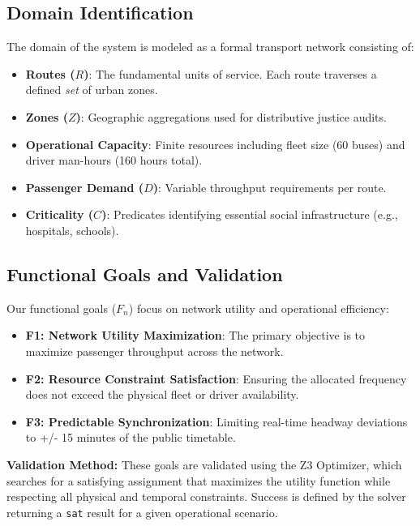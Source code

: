 \documentclass[]
{UCD_CS_41820_Report}
\begin{document}
\subsection{Domain Identification}
The domain of the system is modeled as a formal transport network consisting of:
\begin{itemize}
  \item \textbf{Routes ($R$)}: The fundamental units of service. Each route traverses a defined \textit{set} of urban zones.
  \item \textbf{Zones ($Z$)}: Geographic aggregations used for distributive justice audits.
  \item \textbf{Operational Capacity}: Finite resources including fleet size (60 buses) and driver man-hours (160 hours total).
  \item \textbf{Passenger Demand ($D$)}: Variable throughput requirements per route.
  \item \textbf{Criticality ($C$)}: Predicates identifying essential social infrastructure (e.g., hospitals, schools).
\end{itemize}

\subsection{Functional Goals and Validation}
Our functional goals ($F_{n}$) focus on network utility and operational efficiency:
\begin{itemize}
  \item \textbf{F1: Network Utility Maximization}: The primary objective is to maximize passenger throughput across the network.
  \item \textbf{F2: Resource Constraint Satisfaction}: Ensuring the allocated frequency does not exceed the physical fleet or driver availability.
  \item \textbf{F3: Predictable Synchronization}: Limiting real-time headway deviations to +/- 15 minutes of the public timetable.
\end{itemize}
\textbf{Validation Method:} These goals are validated using the Z3 Optimizer, which searches for a satisfying assignment that maximizes the utility function while respecting all physical and temporal constraints. Success is defined by the solver returning a \texttt{sat} result for a given operational scenario.
\end{document}
